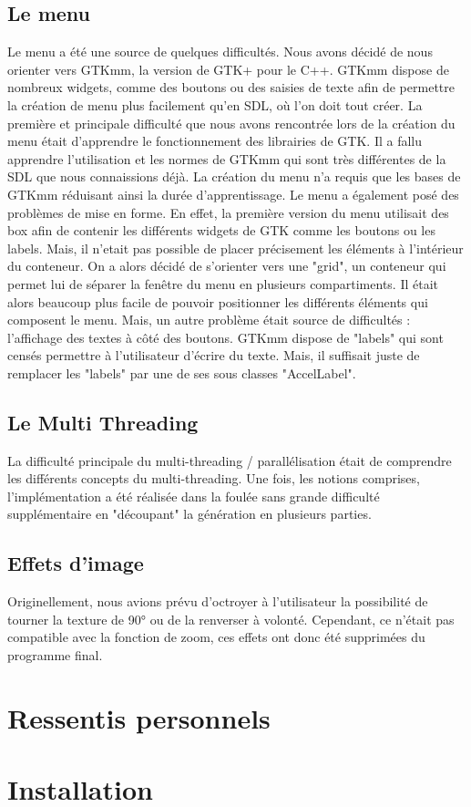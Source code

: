 \documentclass{article}
\begin{document}
	\subsection{Le menu}
	Le menu a été une source de quelques difficultés.
	Nous avons décidé de nous orienter vers GTKmm, la version de GTK+ pour le C++.
	GTKmm dispose de nombreux widgets, comme des boutons ou des saisies de texte afin de permettre la création de menu plus facilement qu'en SDL, où l'on doit tout créer.
	La première et principale difficulté que nous avons rencontrée lors de la création du menu était d'apprendre le fonctionnement des librairies de GTK. Il a fallu apprendre l'utilisation et les normes de GTKmm qui sont très différentes de la SDL que nous connaissions déjà.
	La création du menu n'a requis que les bases de GTKmm réduisant ainsi la durée d'apprentissage.
	Le menu a également posé des problèmes de mise en forme.
	En effet, la première version du menu utilisait des box afin de contenir les différents widgets de GTK comme les boutons ou les labels.
	Mais, il n'etait pas possible de placer précisement les éléments à l'intérieur du conteneur.
	On a alors décidé de s'orienter vers une "grid", un conteneur qui permet lui de séparer la fenêtre du menu en plusieurs compartiments.
	Il était alors beaucoup plus facile de pouvoir positionner les différents éléments qui composent le menu.
	Mais, un autre problème était source de difficultés : l'affichage des textes à côté des boutons.
	GTKmm dispose de "labels" qui sont censés permettre à l'utilisateur d'écrire du texte.
	Mais, il suffisait juste de remplacer les "labels" par une de ses sous classes "AccelLabel".

	\subsection{Le Multi Threading}
	La difficulté principale du multi-threading / parallélisation était de comprendre les différents concepts du multi-threading.
	Une fois, les notions comprises, l'implémentation a été réalisée dans la foulée sans grande difficulté supplémentaire en "découpant" la génération en plusieurs parties.

	\subsection{Effets d'image}

	Originellement, nous avions prévu d'octroyer à l'utilisateur la possibilité de tourner la texture de 90° ou de la renverser à volonté.
    Cependant, ce n'était pas compatible avec la fonction de zoom, ces effets ont donc été supprimées du programme final.

    \section{Ressentis personnels}

	\section{Installation}
\end{document}
